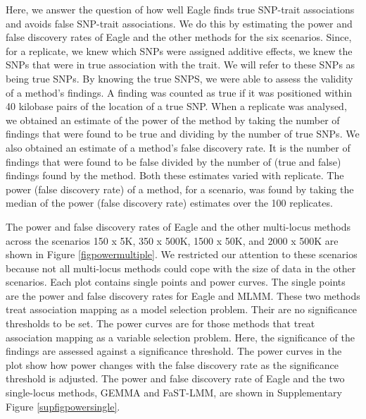 \documentclass{nature}
\begin{document}
Here, we answer the question of how well Eagle finds true SNP-trait associations and avoids false SNP-trait associations. We do this by estimating the power and false discovery rates of Eagle and the other methods for the six scenarios.  Since, for a replicate, we knew which SNPs were assigned additive effects, we knew the SNPs that were in true association with the trait. We will refer to these SNPs as being
true SNPs. By knowing the true SNPS, we were able to assess the validity of a method's findings. A  finding was counted as true if it was positioned within 40 kilobase pairs of the location of a true SNP. When a replicate was analysed, we obtained an estimate of the power of the method by taking  the number of findings that were found to be  true and dividing by the 
number of true SNPs. We also obtained an estimate of a method's false discovery rate. It is the number of findings that were found to be false divided by the number of (true and false) findings found by the method.  Both these estimates varied with replicate. 
The power (false discovery rate) of a method, for a scenario, was found by taking the median of the power (false discovery rate) estimates over the 100 replicates. 


The power and false discovery rates of Eagle and the other multi-locus methods across the scenarios 150 x 5K, 350 x 500K, 1500 x 50K, and 2000 x 500K are shown in Figure \ref{figpowermultiple}.  We restricted our attention to these scenarios because not all 
multi-locus methods could cope with the size of data in the other scenarios. 
  Each plot contains 
single points and power curves. The single points are the power and false discovery rates for Eagle and MLMM.
These two methods treat association mapping as a model selection problem. Their are no significance thresholds to be set. 
The power curves are for those methods that treat association mapping as a variable selection problem. Here, the 
significance of the findings are assessed against a significance threshold. The power curves in the plot show how power changes with 
the false discovery rate as the significance threshold  is adjusted. 
The power and false discovery rate of Eagle and the two single-locus methods, GEMMA and FaST-LMM,  are shown in
Supplementary Figure \ref{supfigpowersingle}. 
\end{document}
